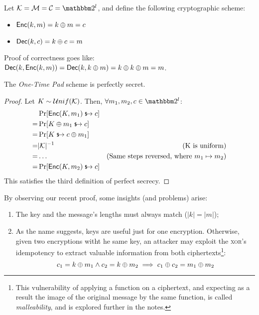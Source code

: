Let $\K = \M = \C = \binary^l$, and define the following cryptographic scheme:
\begin{itemize}
    \item $\textsf{Enc}(k, m) = k \oplus m = c$
    \item $\textsf{Dec}(k, c) = k \oplus c = m$
\end{itemize}

Proof of correctness goes like: $\textsf{Dec}(k, \textsf{Enc}(k, m)) = \textsf{Dec}(k, k \oplus m) = k \oplus k \oplus m = m$.

\begin{theorem}
    The \emph{One-Time Pad} scheme is perfectly secret.
\end{theorem}
\begin{proof}
    Let $K \sim \mathcal{U}nif(\mathcal{K})$. Then, $\forall m_1, m_2, c \in \binary^l$:
    \begin{align*}
        & \Pr[\textsf{Enc}(K, m_1) \evaluatesto c] & \\
        =& \Pr[K \xor m_1 \evaluatesto c] & \\
        =& \Pr[K \evaluatesto c \xor m_1] & \\
        =& |\K|^{-1} & \text{(K is uniform)} \\
        =& \dots & \text{(Same steps reversed, where $m_1 \mapsto m_2$)} \\
        =& \Pr[\textsf{Enc}(K, m_2) \evaluatesto c] &  
    \end{align*}
    This satisfies the third definition of perfect secrecy.
\end{proof}


By observing our recent proof, some insights (and problems) arise:
\begin{enumerate}
    \item The key and the message's lengths must always match ($|k| = |m|$);
    \item As the name suggests, keys are useful just for one encryption. Otherwise, given two encryptions witht he same key, an attacker may exploit the \textsc{xor}'s idempotency to extract valuable information from both ciphertexts\footnote{This vulnerability of applying a function on a ciphertext, and expecting as a result the image of the original message by the same function, is called \emph{malleability}, and is explored further in the notes.}:
    \[
        c_1 = k \oplus m_1 \wedge c_2 = k \oplus m_2 \implies c_1 \oplus c_2 = m_1 \oplus m_2
    \]
    
\end{enumerate}

